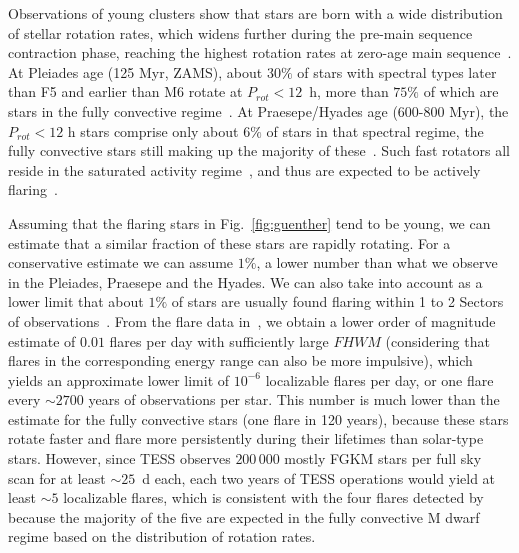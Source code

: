 \documentclass[proof]{WileyASNA-v1}
\newcommand{\jdag}[1]{\textcolor{darkred}{#1}}
\begin{document}
Observations of young clusters show that stars are born with a wide distribution of stellar rotation rates, which widens further during the pre-main sequence contraction phase, reaching the highest rotation rates at zero-age main sequence~\citep[ZAMS,][and references therein]{johnstone2021}. %
At Pleiades age (125 Myr, ZAMS), about $30\%$ of stars with spectral types later than F5 and earlier than M6 rotate at $P_{rot}<12$~h, more than $75\%$ of which are stars in the fully convective regime~\citep{rebull2016}. 
At Praesepe/Hyades age (600-800 Myr), the $P_{rot}<12$ h stars comprise only about $6\%$ of stars in that spectral regime, the fully convective stars still making up the majority of these~\citep{douglas2019}.
Such fast rotators all reside in the saturated activity regime~\citep{wright2011,wright2018,newton2017}, and thus are expected to be actively flaring~\citep{doorsselaere2017, clarke2018}.%

Assuming that the flaring stars in Fig.~\ref{fig:guenther} tend to be young, we can estimate that a similar fraction of these stars are rapidly rotating. For a conservative estimate we can assume $1\%$, a lower number than what we observe in the Pleiades, Praesepe and the Hyades. We can also take into account as a lower limit that about $1\%$ of stars are usually found flaring within 1 to 2 Sectors of observations~\citep{tu2021, guenther2020}. From the flare data in~\citet{guenther2020}, we obtain a lower order of magnitude estimate of $0.01$ flares per day with sufficiently large $FHWM$ (considering that flares in the corresponding energy range can also be more impulsive), which yields an approximate lower limit of $10^{-6}$ localizable flares per day, or one flare every $\sim2 700$ years of observations per star. This number is much lower than the estimate for the fully convective stars (one flare in 120 years), because these stars rotate faster and flare more persistently during their lifetimes than solar-type stars. However, since TESS observes $200\,000$ mostly FGKM stars per full sky scan for at least $\sim 25$~d each, each two years of TESS operations would yield at least $\sim 5$ localizable flares, which is consistent with the four flares detected by \citet{ilin2021b} because the majority of the five are expected in the fully convective M dwarf regime based on the distribution of rotation rates. 
\end{document}
